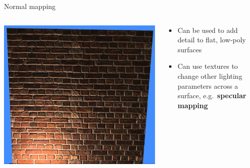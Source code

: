 \begin{frame}{Normal mapping}
\begin{columns}
\begin{column}{0.33\textwidth}
			\includegraphics[width=\textwidth]{normal_mapped_wall}
		\end{column}
		\begin{column}{0.65\textwidth}
			\begin{itemize}
				\item Can be used to add detail to flat, low-poly surfaces
				\pause\item Can use textures to change other lighting parameters across a surface,
					e.g.\ \textbf{specular mapping}
			\end{itemize}
		\end{column}
	\end{columns}
\end{frame}